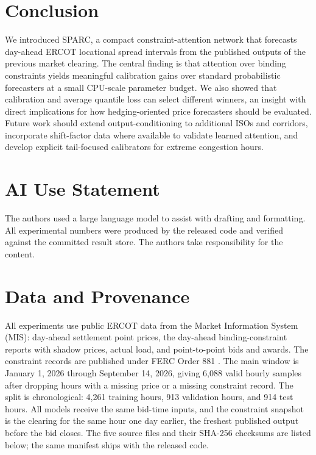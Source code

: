 \documentclass[twoside]{article}
\begin{document}
\section{Conclusion}
We introduced SPARC, a compact constraint-attention network that forecasts day-ahead ERCOT locational spread intervals from the published outputs of the previous market clearing. The central finding is that attention over binding constraints yields meaningful calibration gains over standard probabilistic forecasters at a small CPU-scale parameter budget. We also showed that calibration and average quantile loss can select different winners, an insight with direct implications for how hedging-oriented price forecasters should be evaluated. Future work should extend output-conditioning to additional ISOs and corridors, incorporate shift-factor data where available to validate learned attention, and develop explicit tail-focused calibrators for extreme congestion hours.

\section*{AI Use Statement}
The authors used a large language model to assist with drafting and formatting. All experimental numbers were produced by the released code and verified against the committed result store. The authors take responsibility for the content.

\appendix

\section{Data and Provenance}
All experiments use public ERCOT data from the Market Information System (MIS): day-ahead settlement point prices, the day-ahead binding-constraint reports with shadow prices, actual load, and point-to-point bids and awards. The constraint records are published under FERC Order 881 \citep{ferc2021order881}. The main window is January 1, 2026 through September 14, 2026, giving 6{,}088 valid hourly samples after dropping hours with a missing price or a missing constraint record. The split is chronological: 4{,}261 training hours, 913 validation hours, and 914 test hours. All models receive the same bid-time inputs, and the constraint snapshot is the clearing for the same hour one day earlier, the freshest published output before the bid closes. The five source files and their SHA-256 checksums are listed below; the same manifest ships with the released code.
\end{document}
